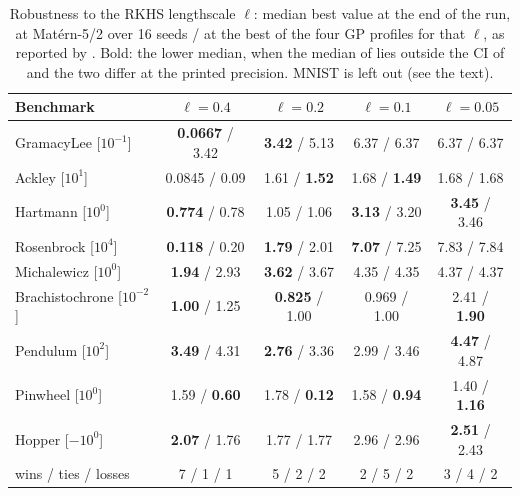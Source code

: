 \begin{table}[t]
\centering
\caption{Robustness to the RKHS lengthscale $\ell$: median best value at the end of the run, \method{} at Mat\'ern-5/2 over 16 seeds / \lzero{} at the best of the four GP profiles for that $\ell$, as reported by \citet{sartor2026sparse}. Bold: the lower median, when the median of \lzero{} lies outside the CI of \method{} and the two differ at the printed precision. MNIST is left out (see the text).}
\label{tab:robustness}
\footnotesize
\setlength{\tabcolsep}{3pt}
\begin{tabular}{lcccc}
\toprule
Benchmark & $\ell = 0.4$ & $\ell = 0.2$ & $\ell = 0.1$ & $\ell = 0.05$ \\
\midrule
GramacyLee [$10^{-1}$] & \textbf{0.0667} / 3.42 & \textbf{3.42} / 5.13 & 6.37 / 6.37 & 6.37 / 6.37 \\
Ackley [$10^{1}$] & 0.0845 / 0.09 & 1.61 / \textbf{1.52} & 1.68 / \textbf{1.49} & 1.68 / 1.68 \\
Hartmann [$10^{0}$] & \textbf{0.774} / 0.78 & 1.05 / 1.06 & \textbf{3.13} / 3.20 & \textbf{3.45} / 3.46 \\
Rosenbrock [$10^{4}$] & \textbf{0.118} / 0.20 & \textbf{1.79} / 2.01 & \textbf{7.07} / 7.25 & 7.83 / 7.84 \\
Michalewicz [$10^{0}$] & \textbf{1.94} / 2.93 & \textbf{3.62} / 3.67 & 4.35 / 4.35 & 4.37 / 4.37 \\
Brachistochrone [$10^{-2}$] & \textbf{1.00} / 1.25 & \textbf{0.825} / 1.00 & 0.969 / 1.00 & 2.41 / \textbf{1.90} \\
Pendulum [$10^{2}$] & \textbf{3.49} / 4.31 & \textbf{2.76} / 3.36 & 2.99 / 3.46 & \textbf{4.47} / 4.87 \\
Pinwheel [$10^{0}$] & 1.59 / \textbf{0.60} & 1.78 / \textbf{0.12} & 1.58 / \textbf{0.94} & 1.40 / \textbf{1.16} \\
Hopper [$-10^{0}$] & \textbf{2.07} / 1.76 & 1.77 / 1.77 & 2.96 / 2.96 & \textbf{2.51} / 2.43 \\
\midrule
wins / ties / losses & 7 / 1 / 1 & 5 / 2 / 2 & 2 / 5 / 2 & 3 / 4 / 2 \\
\bottomrule
\end{tabular}
\end{table}
